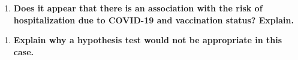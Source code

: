 \documentclass[
]{report}
\providecommand{\tightlist}{%
  \setlength{\itemsep}{0pt}\setlength{\parskip}{0pt}}
\begin{document}
\vspace{0.5in}

\begin{enumerate}
\def\labelenumi{\arabic{enumi}.}
\setcounter{enumi}{9}
\tightlist
\item
  \textbf{Does it appear that there is an association with the risk of hospitalization due to COVID-19 and vaccination status? Explain.}
\end{enumerate}

\vspace{0.5in}

\begin{enumerate}
\def\labelenumi{\arabic{enumi}.}
\setcounter{enumi}{10}
\tightlist
\item
  \textbf{Explain why a hypothesis test would not be appropriate in this case.}
\end{enumerate}

\newpage
\end{document}
